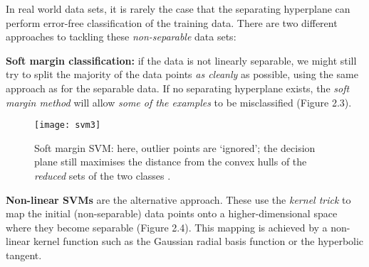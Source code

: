 \documentclass[12pt,twoside,notitlepage,amsart]{report} %
\begin{document}
	In real world data sets, it is rarely the case that the separating hyperplane can perform error-free classification of the training data. There are two different approaches to tackling these \emph{non-separable} data sets:
	
	
	\textbf{Soft margin classification:} if the data is not linearly separable, we might still try to split the majority of the data points \emph{as cleanly} as possible, using the same approach as for the separable data. If no separating hyperplane exists, the \emph{soft margin method} will allow \emph{some of the examples} to be misclassified (Figure 2.3). 
	
	\begin{figure} 
	\texttt{[image: svm3]}
	\caption{\small{Soft margin SVM: here, outlier points are `ignored'; the decision plane still maximises the distance from the convex hulls of the \emph{reduced} sets of the two classes \cite{Bishop06}. }}%
	\label{}%
	\end{figure}
	
	
	
	
	
	\textbf{Non-linear SVMs} are the alternative approach. These use the \emph{kernel trick} to map the initial (non-separable) data points onto a higher-dimensional space where they become separable (Figure 2.4). This mapping is achieved by a non-linear kernel function such as the Gaussian radial basis function or the hyperbolic tangent. \\
	
	\phantom{a}
	
	
	
\end{document}

